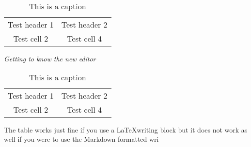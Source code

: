 \begin{table} 
    \begin{tabular}{ c c }
        Test header 1 & Test header 2 \\ 
        Test cell 2 & Test cell 4 \\ 
    \end{tabular} 
    \caption{This is a caption} 
\end{table}\textit{Getting to know the new editor}

\begin{table} 
    \begin{tabular}{ c c }
        Test header 1 & Test header 2 \\ 
        Test cell 2 & Test cell 4 \\ 
    \end{tabular} 
    \caption{This is a caption} 
\end{table}

The table works just fine if you use a \LaTeX writing block but it does not work as well if you were to use the Markdown formatted wri
